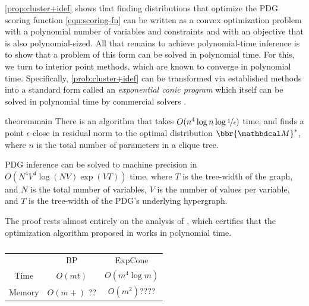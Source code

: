 \documentclass[twoside]{article}
\begin{document}
\cref{prop:cluster+idef} shows that finding distributions that optimize the PDG scoring function \eqref{eqn:scoring-fn} can be written as a convex optimization problem with a
polynomial number of variables and constraints and with an objective that is also polynomial-sized.
All that remains to achieve polynomial-time inference is to show that a problem of this form can be solved in polynomial time. For this, we turn to interior point methods, which are known \parencite{badenbroek2021algorithm} to converge in polynomial time.
Specifically, \eqref{prob:cluster+idef} can be transformed via established methods \parencite{agrawal2018rewriting} into a standard form called an \emph{exponential conic program} which itself can be solved in polynomial time by commercial solvers \parencite{mosek}. 


\begin{linked}{theorem}{main}
There is an algorithm that takes $O(n^4 \log n  \log \nicefrac1\epsilon )$ time,
and finds a point $\epsilon$-close in residual norm to the optimal distribution
$\bbr{\dg M}^*$, where $n$ is the total number of parameters in a clique tree.
\end{linked}

\begin{coro}
    PDG inference can be solved to machine precision in $O( N^4 V^4 \log(N V) \exp(V T) )$ time, where $T$ is the tree-width of the graph, and $N$ is the total number of variables, $V$ is the number of values per variable, and $T$ is the tree-width of the PDG's underlying hypergraph.
\end{coro}

 

The proof rests almost entirely on the analysis of \textcite{badenbroek2021algorithm},
which certifies that the optimization algorithm 
proposed in \textcite{dahl2022primal} works in polynomial time. 

\begin{table}
    \centering
    \begin{tabular}{ccc}
        \toprule
        & BP &  ExpCone \\\cmidrule(lr){2-3}
        Time & $O(m t)$ & $O( m^4 \log m )$ \\
        Memory  & $O(m + )$ {\color{red}??} & $O( m^2 )${\color{red}????}\\    \bottomrule
    \end{tabular}
    
    
    \caption{ }
\end{table}
\end{document}
